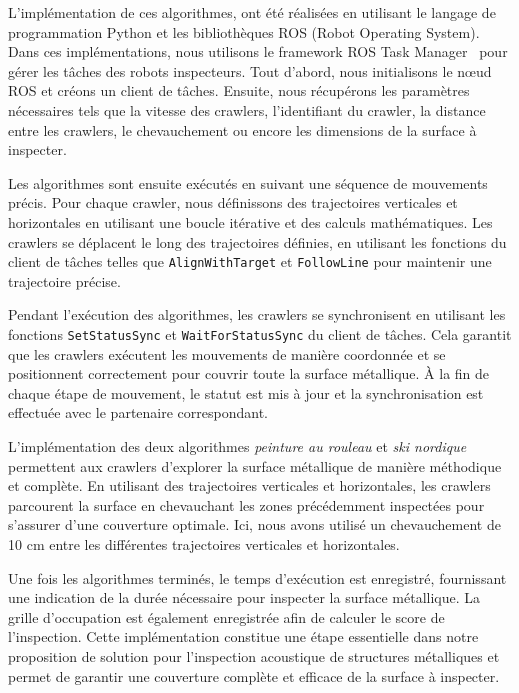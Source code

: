 \documentclass[francais,RandD]{rapportPFE}
\begin{document}
			L'implémentation de ces algorithmes, ont été réalisées en utilisant le langage de programmation Python et les bibliothèques ROS (Robot Operating System).
			Dans ces implémentations, nous utilisons le framework ROS Task Manager~\cite{ROSTaskManager} pour gérer les tâches des robots inspecteurs.
			Tout d'abord, nous initialisons le nœud ROS et créons un client de tâches.
			Ensuite, nous récupérons les paramètres nécessaires tels que la vitesse des crawlers, l'identifiant du crawler, la distance entre les crawlers, le chevauchement ou encore les dimensions de la surface à inspecter.

			Les algorithmes sont ensuite exécutés en suivant une séquence de mouvements précis.
			Pour chaque crawler, nous définissons des trajectoires verticales et horizontales en utilisant une boucle itérative et des calculs mathématiques. Les crawlers se déplacent le long des trajectoires définies, en utilisant les fonctions du client de tâches telles que \texttt{AlignWithTarget} et \texttt{FollowLine} pour maintenir une trajectoire précise.

			Pendant l'exécution des algorithmes, les crawlers se synchronisent en utilisant les fonctions \texttt{SetStatusSync} et \texttt{WaitForStatusSync} du client de tâches.
			Cela garantit que les crawlers exécutent les mouvements de manière coordonnée et se positionnent correctement pour couvrir toute la surface métallique.
			À la fin de chaque étape de mouvement, le statut est mis à jour et la synchronisation est effectuée avec le partenaire correspondant.

			L'implémentation des deux algorithmes \textit{peinture au rouleau} et \textit{ski nordique} permettent aux crawlers d'explorer la surface métallique de manière méthodique et complète.
			En utilisant des trajectoires verticales et horizontales, les crawlers parcourent la surface en chevauchant les zones précédemment inspectées pour s'assurer d'une couverture optimale.
			Ici, nous avons utilisé un chevauchement de 10 cm entre les différentes trajectoires verticales et horizontales.

			Une fois les algorithmes terminés, le temps d'exécution est enregistré, fournissant une indication de la durée nécessaire pour inspecter la surface métallique.
			La grille d'occupation est également enregistrée afin de calculer le score de l'inspection.
			Cette implémentation constitue une étape essentielle dans notre proposition de solution pour l'inspection acoustique de structures métalliques et permet de garantir une couverture complète et efficace de la surface à inspecter.
\end{document}
